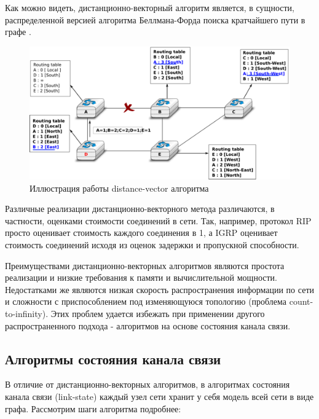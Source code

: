 \documentclass[specification, annotation]{itmo-student-thesis}
\begin{document}
Как можно видеть, дистанционно-векторный алгоритм является, в сущности,
распределенной версией алгоритма Беллмана-Форда поиска кратчайшего пути в
графе \cite{bellman-ford}.

\begin{figure}[!h]
  \caption{Иллюстрация работы distance-vector алгоритма}\label{rip-img}
  \centering
  \includegraphics[scale=1.5]{dv-failure-2}
\end{figure}

Различные реализации дистанционно-векторного метода различаются, в частности,
оценками стоимости соединений в сети. Так, например, протокол RIP \cite{rip-rfc} просто
оценивает стоимость каждого соединения в 1, а IGRP \cite{igrp-patent} оценивает
стоимость соединений исходя из оценок задержки и пропускной способности.

Преимуществами дистанционно-векторных алгоритмов являются простота реализации и
низкие требования к памяти и вычислительной мощности. Недостатками же являются
низкая скорость распространения информации по сети и сложности с приспособлением
под изменяющуюся топологию (проблема count-to-infinity). Этих проблем
удается избежать при применении другого распространенного подхода - алгоритмов
на основе состояния канала связи. 

\subsection{Алгоритмы состояния канала связи}

В отличие от дистанционно-векторных алгоритмов, в алгоритмах состояния канала связи
(link-state) каждый узел сети хранит у себя модель всей сети в виде графа.
Рассмотрим шаги алгоритма подробнее:
\end{document}
